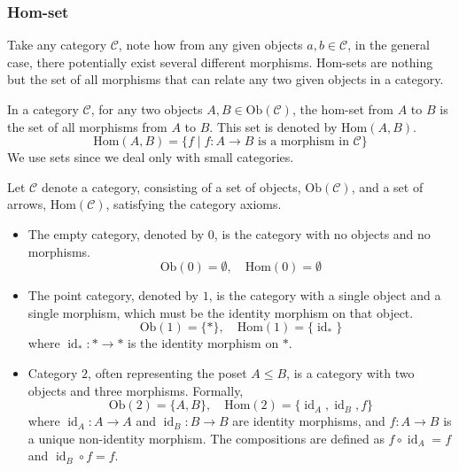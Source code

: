 \subsubsection{\centering Hom-set}

Take any category $\mathcal{C}$, note how from any given objects $a, b \in \mathcal{C}$, in the general case, there potentially exist several different morphisms. Hom-sets are nothing but the set of all morphisms that can relate any two given objects in a category.

\begin{definition}
  In a category $\mathcal{C}$, for any two objects $A, B \in \mathrm{Ob}(\mathcal{C})$, the hom-set from $A$ to $B$ is the set of all morphisms from $A$ to $B$. This set is denoted by $\mathrm{Hom}(A, B)$.
  \[
    \mathrm{Hom}(A, B) = \{ f \mid f \colon A \to B \text{ is a morphism in } \mathcal{C} \}
  \]
  We use sets since we deal only with small categories.  
\end{definition}

\begin{example} Let $\mathcal{C}$ denote a category, consisting of a set of objects, $\mathrm{Ob}(\mathcal{C})$, and a set of arrows, $\mathrm{Hom}(\mathcal{C})$, satisfying the category axioms.
  \label{ex:012-categories}
  \begin{itemize}
  \item The empty category, denoted by $0$, is the category with no objects and no morphisms.
    \[\text{Ob}(0) = \emptyset, \quad \text{Hom}(0) = \emptyset \]
  \item The point category, denoted by $1$, is the category with a single object and a single morphism, which must be the identity morphism on that object.
    \[ \text{Ob}(1) = \{*\}, \quad \text{Hom}(1) = \{\operatorname{id}_*\} \]
    where $\operatorname{id}_*: * \to *$ is the identity morphism on $*$.
  \item Category \(2\), often representing the poset $A \le B$, is a category with two objects and three morphisms. Formally,
    \[ \text{Ob}(2) = \{A, B\}, \quad \text{Hom}(2) = \{\operatorname{id}_A, \operatorname{id}_B, f\} \]
    where $\operatorname{id}_A: A \to A$ and $\operatorname{id}_B: B \to B$ are identity morphisms, and $f: A \to B$ is a unique non-identity morphism. The compositions are defined as $f \circ \operatorname{id}_A = f$ and $\operatorname{id}_B \circ f = f$.
  \end{itemize}
\end{example}

